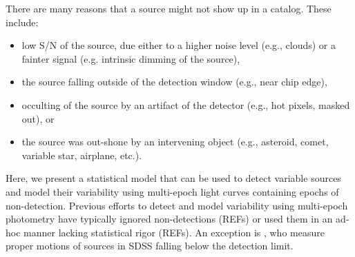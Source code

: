 \documentclass[12pt,preprint]{aastex}
\begin{document}
There are many reasons that a source might not show up in a catalog.  These include:
\begin{itemize}
\item low S/N of the source, due either to a higher noise level (e.g., clouds) or a fainter signal (e.g. intrinsic dimming of the source),
\item the source falling outside of the detection window (e.g., near chip edge),
\item occulting of the source by an artifact of the detector (e.g., hot pixels, masked out), or
\item the source was out-shone by an intervening object (e.g., asteroid, comet, variable star, airplane, etc.).
\end{itemize}
Here, we present a statistical model that can be used to detect variable sources and model their variability using multi-epoch light curves containing epochs of non-detection.  Previous efforts to detect and model variability using multi-epoch photometry have typically ignored non-detections (REFs) or used them in an ad-hoc manner lacking statistical rigor (REFs).  An exception is \citet{2009AJ....137.4400L}, who measure proper motions of sources in SDSS falling below the detection limit.


%
%
\end{document}
